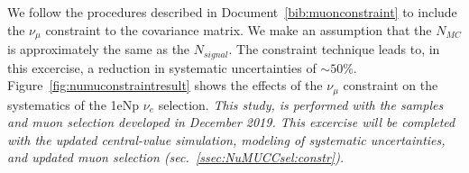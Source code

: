 \documentclass[a4paper]{article}
\begin{document}
\par We follow the procedures described in Document~\ref{bib:muonconstraint} to include the $\nu_\mu$ constraint to the covariance matrix. We make an assumption that the $N_{MC}$ is approximately the same as the $N_{signal}$. The constraint technique leads to, in this excercise, a reduction in systematic uncertainties of $\sim50$\%.
Figure~\ref{fig:numuconstraintresult} shows the effects of the $\nu_\mu$ constraint on the systematics of the 1eNp $\nu_e$ selection. \emph{This study, is performed with the samples and muon selection developed in December 2019. This excercise will be completed with the updated central-value simulation, modeling of systematic uncertainties, and updated muon selection (sec.~\ref{ssec:NuMUCCsel:constr}).} 

\end{document}
